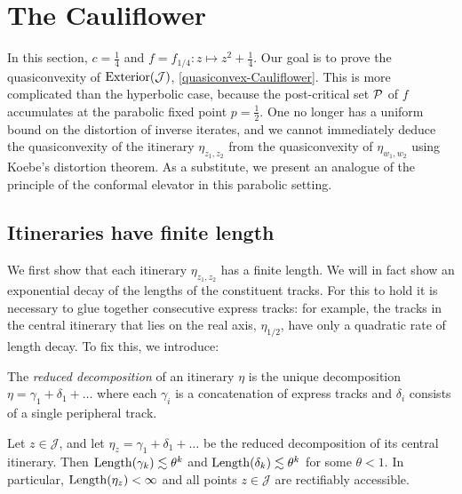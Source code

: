 \section{The Cauliflower}
In this section, $c=\frac 14$ and $f=f_{1/4}: z\mapsto z^2+ \frac 14$.
Our goal is to prove the quasiconvexity of $\operatorname{Exterior}(\mathcal{J})$, \cref{quasiconvex-Cauliflower}. 
This is more complicated than the hyperbolic case, 
because the post-critical set $\operatorname{\mathcal P}$ of $f$ accumulates at the parabolic fixed point $p=\frac 12$. 
One no longer has a uniform bound on the distortion of inverse iterates, 
and we cannot immediately deduce the quasiconvexity of the itinerary $\eta_{z_1,z_2}$ from the quasiconvexity of $\eta_{w_1,w_2}$ using Koebe's distortion theorem. 
As a substitute, we present an analogue of the principle of the conformal elevator in this parabolic setting.

\subsection{Itineraries have finite length}
We first show that each itinerary $\eta_{z_1,z_2}$ has a finite length. 
We will in fact show an exponential decay of the lengths of the constituent tracks. 
For this to hold it is necessary to glue together consecutive express tracks: 
for example, the tracks in the central itinerary that lies on the real axis, $\eta_{1/2}$, 
have only a quadratic rate of length decay. To fix this, we introduce:

\begin{definition}
	The \emph{reduced decomposition} of an itinerary $\eta$ is the unique decomposition $\eta=\gamma_1 + \delta_1 + \dots$ where each $\gamma_i$ is a concatenation of express tracks and $\delta_i$ consists of a single peripheral track.
\end{definition}

\begin{proposition} \label{prop:finite-length}
	Let $z \in \mathcal J$, and let $\eta_z= \gamma_1 + \delta_1 + \dots  $ be the reduced decomposition of its central itinerary. Then $\operatorname{Length}(\gamma_k)\lesssim \theta^k$ and $\operatorname{Length}(\delta_k)\lesssim \theta^k$ for some $\theta < 1$. In particular, $\operatorname{Length}(\eta_z)<\infty$ and all points $z\mathcal \in \mathcal J$ are rectifiably accessible.
\end{proposition}

